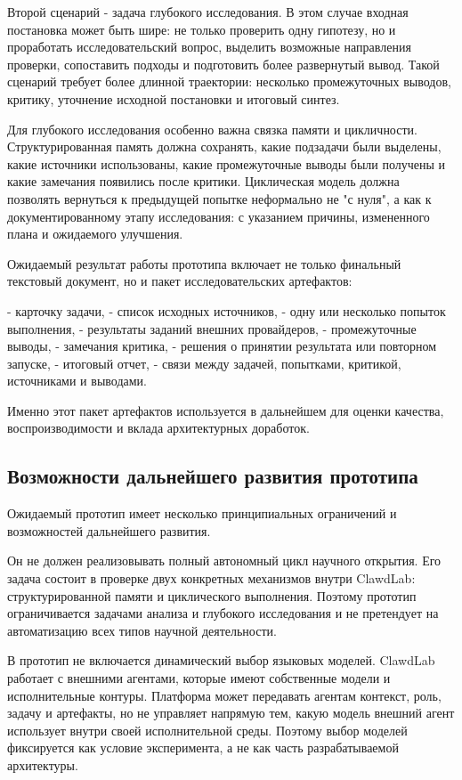 Второй сценарий - задача глубокого исследования. В этом случае входная постановка может быть шире: не только проверить одну гипотезу, но и проработать исследовательский вопрос, выделить возможные направления проверки, сопоставить подходы и подготовить более развернутый вывод. Такой сценарий требует более длинной траектории: несколько промежуточных выводов, критику, уточнение исходной постановки и итоговый синтез.

Для глубокого исследования особенно важна связка памяти и цикличности. Структурированная память должна сохранять, какие подзадачи были выделены, какие источники использованы, какие промежуточные выводы были получены и какие замечания появились после критики. Циклическая модель должна позволять вернуться к предыдущей попытке неформально не "с нуля", а как к документированному этапу исследования: с указанием причины, измененного плана и ожидаемого улучшения.

Ожидаемый результат работы прототипа включает не только финальный текстовый документ, но и пакет исследовательских артефактов:

- карточку задачи,
- список исходных источников,
- одну или несколько попыток выполнения,
- результаты заданий внешних провайдеров,
- промежуточные выводы,
- замечания критика,
- решения о принятии результата или повторном запуске,
- итоговый отчет,
- связи между задачей, попытками, критикой, источниками и выводами.

Именно этот пакет артефактов используется в дальнейшем для оценки качества, воспроизводимости и вклада архитектурных доработок.

\subsection{Возможности дальнейшего развития прототипа}

Ожидаемый прототип имеет несколько принципиальных ограничений и возможностей дальнейшего развития.

Он не должен реализовывать полный автономный цикл научного открытия. Его задача состоит в проверке двух конкретных механизмов внутри ClawdLab: структурированной памяти и циклического выполнения. Поэтому прототип ограничивается задачами анализа и глубокого исследования и не претендует на автоматизацию всех типов научной деятельности.

В прототип не включается динамический выбор языковых моделей. ClawdLab работает с внешними агентами, которые имеют собственные модели и исполнительные контуры. Платформа может передавать агентам контекст, роль, задачу и артефакты, но не управляет напрямую тем, какую модель внешний агент использует внутри своей исполнительной среды. Поэтому выбор моделей фиксируется как условие эксперимента, а не как часть разрабатываемой архитектуры.

